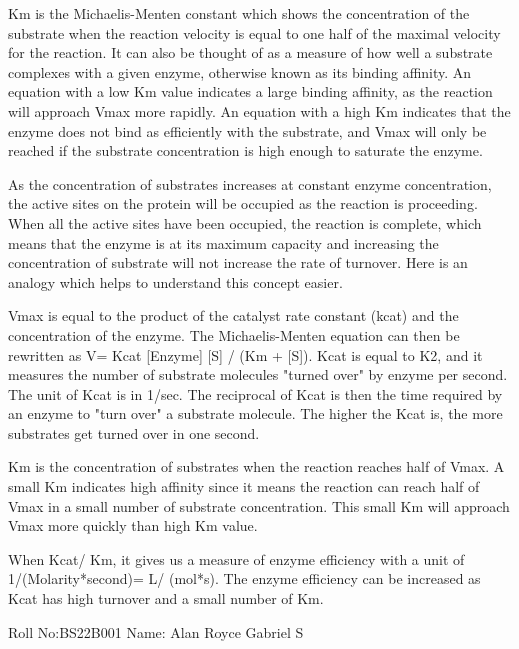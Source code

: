 \documentclass{article}
\begin{document}
Km is the Michaelis-Menten constant which shows the concentration of the substrate when the reaction velocity is equal to one half of the maximal velocity for the reaction. It can also be thought of as a measure of how well a substrate complexes with a given enzyme, otherwise known as its binding affinity. An equation with a low Km value indicates a large binding affinity, as the reaction will approach Vmax more rapidly. An equation with a high Km indicates that the enzyme does not bind as efficiently with the substrate, and Vmax will only be reached if the substrate concentration is high enough to saturate the enzyme.

As the concentration of substrates increases at constant enzyme concentration, the active sites on the protein will be occupied as the reaction is proceeding. When all the active sites have been occupied, the reaction is complete, which means that the enzyme is at its maximum capacity and increasing the concentration of substrate will not increase the rate of turnover. Here is an analogy which helps to understand this concept easier.

Vmax is equal to the product of the catalyst rate constant (kcat) and the concentration of the enzyme. The Michaelis-Menten equation can then be rewritten as V= Kcat [Enzyme] [S] / (Km + [S]). Kcat is equal to K2, and it measures the number of substrate molecules "turned over" by enzyme per second. The unit of Kcat is in 1/sec. The reciprocal of Kcat is then the time required by an enzyme to "turn over" a substrate molecule. The higher the Kcat is, the more substrates get turned over in one second.

Km is the concentration of substrates when the reaction reaches half of Vmax. A small Km indicates high affinity since it means the reaction can reach half of Vmax in a small number of substrate concentration. This small Km will approach Vmax more quickly than high Km value.

When Kcat/ Km, it gives us a measure of enzyme efficiency with a unit of 1/(Molarity*second)= L/ (mol*s). The enzyme efficiency can be increased as Kcat has high turnover and a small number of Km. 

Roll No:BS22B001
Name: Alan Royce Gabriel S
\end{document}
